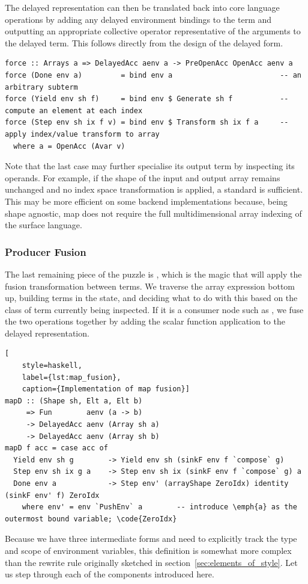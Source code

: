 The delayed representation can then be translated back into core language
operations by adding any delayed environment bindings to the term and outputting
an appropriate collective operator representative of the arguments to the
delayed term. This follows directly from the design of the delayed form.
%
\begin{lstlisting}[style=haskell]
force :: Arrays a => DelayedAcc aenv a -> PreOpenAcc OpenAcc aenv a
force (Done env a)         = bind env a                         -- an arbitrary subterm
force (Yield env sh f)     = bind env $ Generate sh f           -- compute an element at each index
force (Step env sh ix f v) = bind env $ Transform sh ix f a     -- apply index/value transform to array
  where a = OpenAcc (Avar v)
\end{lstlisting}
%
Note that the last case may further specialise its output term by inspecting its
operands. For example, if the shape of the input and output array remains
unchanged and no index space transformation is applied, a standard 
is sufficient. This may be more efficient on some backend implementations
because, being shape agnostic, map does not require the full multidimensional
array indexing of the surface language.

\subsubsection{Producer Fusion}

The last remaining piece of the puzzle is , which is the magic
that will apply the fusion transformation between terms. We traverse the array
expression bottom up, building terms in the  state, and
deciding what to do with this based on the class of term currently being
inspected. If it is a consumer node such as , we fuse the two
operations together by adding the scalar function application to the delayed
representation.
%
\begin{lstlisting}[
    style=haskell,
    label={lst:map_fusion},
    caption={Implementation of map fusion}]
mapD :: (Shape sh, Elt a, Elt b)
     => Fun        aenv (a -> b)
     -> DelayedAcc aenv (Array sh a)
     -> DelayedAcc aenv (Array sh b)
mapD f acc = case acc of
  Yield env sh g        -> Yield env sh (sinkF env f `compose` g)
  Step env sh ix g a    -> Step env sh ix (sinkF env f `compose` g) a
  Done env a            -> Step env' (arrayShape ZeroIdx) identity (sinkF env' f) ZeroIdx
    where env' = env `PushEnv` a        -- introduce \emph{a} as the outermost bound variable; \code{ZeroIdx}
\end{lstlisting}
%
Because we have three intermediate forms and need to explicitly track the type
and scope of environment variables, this definition is somewhat more complex
than the rewrite rule originally sketched in
section~\ref{sec:elements_of_style}. Let us step through each of the components
introduced here.


